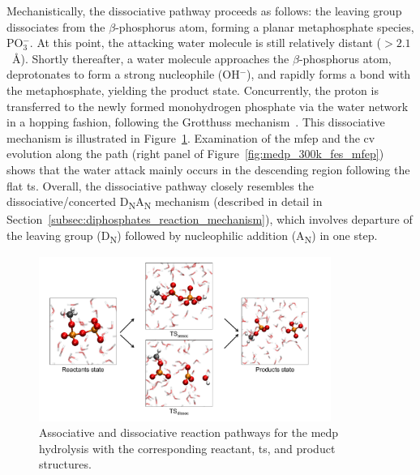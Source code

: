 Mechanistically, the dissociative pathway proceeds as follows: the leaving group dissociates from the $\beta$-phosphorus atom, forming a planar metaphosphate species, PO$_3^-$. At this point, the attacking water molecule is still relatively distant ($>2.1$~\AA). Shortly thereafter, a water molecule approaches the $\beta$-phosphorus atom, deprotonates to form a strong nucleophile (OH$^-$), and rapidly forms a bond with the metaphosphate, yielding the product state. Concurrently, the proton is transferred to the newly formed monohydrogen phosphate via the water network in a hopping fashion, following the Grotthuss mechanism~\citep{degrotthussDecompositionLeauCorps1806, cukiermanTuGrotthussOther2006}. This dissociative mechanism is illustrated in Figure~\ref{fig:medp_reaction_mechanism}. Examination of the \ac{mfep} and the \ac{cv} evolution along the path (right panel of Figure~\ref{fig:medp_300k_fes_mfep}) shows that the water attack mainly occurs in the descending region following the flat \ac{ts}. Overall, the dissociative pathway closely resembles the dissociative/concerted D\textsubscript{N}A\textsubscript{N} mechanism (described in detail in Section~\ref{subsec:diphosphates_reaction_mechanism}), which involves departure of the leaving group (D\textsubscript{N}) followed by nucleophilic addition (A\textsubscript{N}) in one step.

\begin{figure}[b!]
    \centering
    \includegraphics[width=0.85\textwidth]{Figures/4_Results/results_medp_mechanism.pdf}
    \caption{Associative and dissociative reaction pathways for the \ac{medp} hydrolysis with the corresponding reactant, \ac{ts}, and product structures.}
    \label{fig:medp_reaction_mechanism}
\end{figure}

